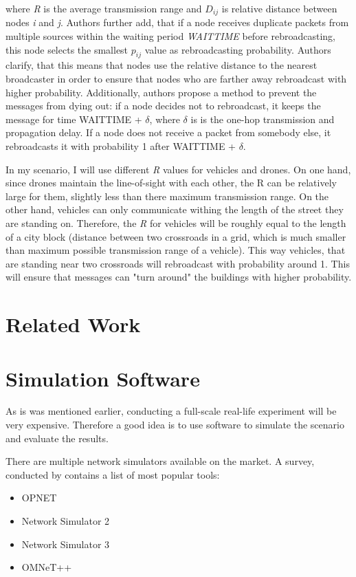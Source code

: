 \documentclass[]{nsm-thesis}
\begin{document}
where \emph{R} is the average transmission range and $D_{ij}$ is relative distance between nodes \emph{i} and \emph{j}. Authors further add, that if a node receives duplicate packets from multiple sources within the waiting period \emph{WAIT\textunderscore TIME} before rebroadcasting, this node selects the smallest $p_{ij}$ value as rebroadcasting probability. Authors clarify, that this means that nodes use the relative distance to the nearest broadcaster in order to ensure that nodes who are farther away rebroadcast with higher probability. Additionally, authors propose a method to prevent the messages from dying out: if a node decides not to rebroadcast, it keeps the message for time WAIT\textunderscore TIME + $\delta$, where $\delta$ is is the one-hop transmission and propagation delay. If a node does not receive a packet from somebody else, it rebroadcasts it with probability 1 after WAIT\textunderscore TIME + $\delta$.

In my scenario, I will use different \emph{R} values for vehicles and drones. On one hand, since drones maintain the line-of-sight with each other, the R can be relatively large for them, slightly less than there maximum transmission range. On the other hand, vehicles can only communicate withing the length of the street they are standing on. Therefore, the \emph{R} for vehicles will be roughly equal to the length of a city block (distance between two crossroads in a grid, which is much smaller than maximum possible transmission range of a vehicle). This way vehicles, that are standing near two crossroads will rebroadcast with probability around 1. This will ensure that messages can "turn around" the buildings with higher probability.

\section {Related Work}

\section {Simulation Software}

As is was mentioned earlier, conducting a full-scale real-life experiment will be very expensive. Therefore a good idea is to use software to simulate the scenario and evaluate the results. 

There are multiple network simulators available on the market. A survey, conducted by \textcite{pan2008survey} contains a list of most popular tools:
\begin{itemize}
\item OPNET \cite[Page~5]{pan2008survey}
\item Network Simulator 2 \cite[Page~7]{pan2008survey}
\item Network Simulator 3 \cite[Page~8]{pan2008survey}
\item OMNeT++ \cite[Page~10]{pan2008survey}
\end{itemize}
\end{document}
